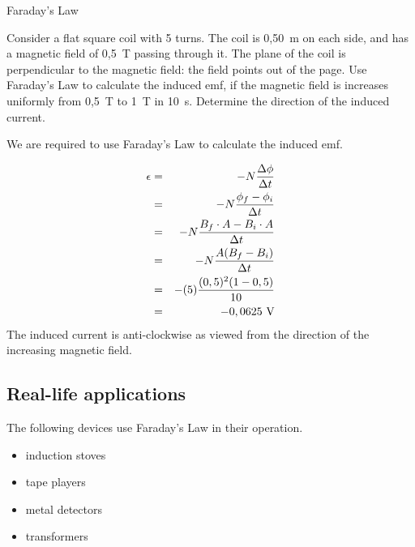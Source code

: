 
\begin{wex}
{Faraday's Law} {Consider a flat square coil with 5 turns. The
coil is 0,50~m on each side, and has a magnetic field of 0,5~T
passing through it. The plane of the coil is perpendicular to the
magnetic field: the field points out of the page. Use Faraday's
Law to calculate the induced emf, if the magnetic field is
increases uniformly from 0,5~T to 1~T in 10~s. Determine the
direction of the induced current.

} { We are required to use
Faraday's Law to calculate the induced emf.

 

\begin{eqnarray*}
\epsilon&=&-N\frac{\Delta \phi}{\Delta t}\\
&=&-N\frac{\phi_f-\phi_i}{\Delta t}\\
&=&-N\frac{B_f\cdot A-B_i\cdot A}{\Delta t}\\
&=&-N\frac{A(B_f -B_i)}{\Delta t}\\
&=&-(5)\frac{(0,5)^2(1-0,5)}{10}\\
&=&-0,0625~\rm{V}
\end{eqnarray*}
The induced current is anti-clockwise as viewed from the direction of the increasing magnetic field.
}
\end{wex}

\subsection{Real-life applications}
The following devices use Faraday's Law in their operation.
\begin{itemize}
\item{induction stoves}
\item{tape players}
\item{metal detectors}
\item{transformers}
\end{itemize}



